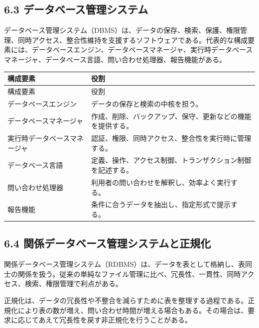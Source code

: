 \documentclass[a4paper,11pt]{ltjsarticle}
\begin{document}
\subsection{6.3 データベース管理システム}

データベース管理システム（DBMS）は、データの保存、検索、保護、権限管理、同時アクセス、整合性維持を支援するソフトウェアである。代表的な構成要素には、データベースエンジン、データベースマネージャ、実行時データベースマネージャ、データベース言語、問い合わせ処理器、報告機能がある。

\begin{longtable}{>{\raggedright\arraybackslash}p{}>{\raggedright\arraybackslash}p{}}
\toprule
構成要素 & 役割 \\
\midrule
\endfirsthead
\toprule
構成要素 & 役割 \\
\midrule
\endhead
データベースエンジン & データの保存と検索の中核を担う。 \\
データベースマネージャ & 作成、削除、バックアップ、保守、更新などの機能を提供する。 \\
実行時データベースマネージャ & 認証、権限、同時アクセス、整合性を実行時に管理する。 \\
データベース言語 & 定義、操作、アクセス制御、トランザクション制御を記述する。 \\
問い合わせ処理器 & 利用者の問い合わせを解釈し、効率よく実行する。 \\
報告機能 & 条件に合うデータを抽出し、指定形式で提示する。 \\
\bottomrule
\end{longtable}

\subsection{6.4 関係データベース管理システムと正規化}

関係データベース管理システム（RDBMS）は、データを表として格納し、表同士の関係を扱う。従来の単純なファイル管理に比べ、冗長性、一貫性、同時アクセス、検索、権限管理で利点がある。

正規化は、データの冗長性や不整合を減らすために表を整理する過程である。正規化により表の数が増え、問い合わせ時間が増える場合もある。その場合は、要求に応じてあえて冗長性を戻す非正規化を行うことがある。
\end{document}
